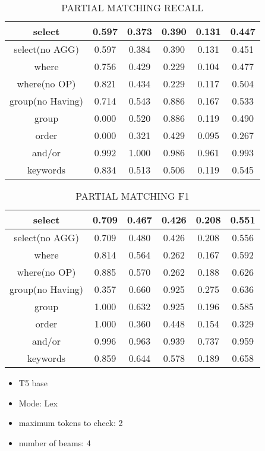 \begin{table}[h!]
    \centering
    \begin{tabular}{|c|c|c|c|c|c|}
        \hline
        select           & 0.597 & 0.373 & 0.390 & 0.131 & 0.447 \\ \hline
        select(no AGG)   & 0.597 & 0.384 & 0.390 & 0.131 & 0.451 \\ \hline
        where            & 0.756 & 0.429 & 0.229 & 0.104 & 0.477 \\ \hline
        where(no OP)     & 0.821 & 0.434 & 0.229 & 0.117 & 0.504 \\ \hline
        group(no Having) & 0.714 & 0.543 & 0.886 & 0.167 & 0.533 \\ \hline
        group            & 0.000 & 0.520 & 0.886 & 0.119 & 0.490 \\ \hline
        order            & 0.000 & 0.321 & 0.429 & 0.095 & 0.267 \\ \hline
        and/or           & 0.992 & 1.000 & 0.986 & 0.961 & 0.993 \\ \hline

        keywords         & 0.834 & 0.513 & 0.506 & 0.119 & 0.545 \\ \hline
    \end{tabular}
    \caption{PARTIAL MATCHING RECALL }

\end{table}
\begin{table}[h!]
    \centering
    \begin{tabular}{|c|c|c|c|c|c|}
        \hline
        select           & 0.709 & 0.467 & 0.426 & 0.208 & 0.551 \\ \hline
        select(no AGG)   & 0.709 & 0.480 & 0.426 & 0.208 & 0.556 \\ \hline
        where            & 0.814 & 0.564 & 0.262 & 0.167 & 0.592 \\ \hline
        where(no OP)     & 0.885 & 0.570 & 0.262 & 0.188 & 0.626 \\ \hline
        group(no Having) & 0.357 & 0.660 & 0.925 & 0.275 & 0.636 \\ \hline
        group            & 1.000 & 0.632 & 0.925 & 0.196 & 0.585 \\ \hline
        order            & 1.000 & 0.360 & 0.448 & 0.154 & 0.329 \\ \hline
        and/or           & 0.996 & 0.963 & 0.939 & 0.737 & 0.959 \\ \hline

        keywords         & 0.859 & 0.644 & 0.578 & 0.189 & 0.658 \\ \hline
    \end{tabular}
    \caption{PARTIAL MATCHING F1 }

\end{table}
\pagebreak
\begin{itemize}
    \item T5 base
    \item Mode: Lex
    \item maximum tokens to check: 2
    \item number of beams: 4
\end{itemize}

